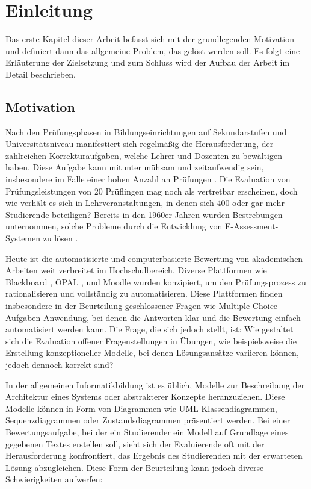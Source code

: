 \chapter{Einleitung}

Das erste Kapitel dieser Arbeit befasst sich mit der grundlegenden Motivation und definiert dann das allgemeine Problem, das gelöst werden soll. Es folgt eine Erläuterung der Zielsetzung und zum Schluss wird der Aufbau der Arbeit im Detail beschrieben.

\section{Motivation}

Nach den Prüfungsphasen in Bildungseinrichtungen auf Sekundarstufen und Universitätsniveau manifestiert sich regelmäßig die Herausforderung, der zahlreichen Korrekturaufgaben, welche Lehrer und Dozenten zu bewältigen haben. Diese Aufgabe kann mitunter mühsam und zeitaufwendig sein, insbesondere im Falle einer hohen Anzahl an Prüfungen \cite{aufwendig}. Die Evaluation von Prüfungsleistungen von 20 Prüflingen mag noch als vertretbar erscheinen, doch wie verhält es sich in Lehrveranstaltungen, in denen sich 400 oder gar mehr Studierende beteiligen? Bereits in den 1960er Jahren wurden Bestrebungen unternommen, solche Probleme durch die Entwicklung von \gls{E-Assessment-Systemen} zu lösen \cite{Hollingsworth}.

Heute ist die automatisierte und computerbasierte Bewertung von akademischen Arbeiten weit verbreitet im Hochschulbereich. Diverse Plattformen wie Blackboard \cite{blackboard}, \ac{OPAL} \cite{opal}, und Moodle \cite{moodle} wurden konzipiert, um den Prüfungsprozess zu rationalisieren und vollständig zu automatisieren. Diese Plattformen finden insbesondere in der Beurteilung geschlossener Fragen wie Multiple-Choice-Aufgaben Anwendung, bei denen die Antworten klar und die Bewertung einfach automatisiert werden kann. Die Frage, die sich jedoch stellt, ist: Wie gestaltet sich die Evaluation offener Fragenstellungen in Übungen, wie beispielsweise die Erstellung konzeptioneller Modelle, bei denen Lösungsansätze variieren können, jedoch dennoch korrekt sind?

In der allgemeinen Informatikbildung ist es üblich, Modelle zur Beschreibung der Architektur eines Systems oder abstrakterer Konzepte heranzuziehen. Diese Modelle können in Form von Diagrammen wie \ac{UML}-Klassendiagrammen, Sequenzdiagrammen oder Zustandsdiagrammen präsentiert werden. Bei einer Bewertungsaufgabe, bei der ein Studierender ein Modell auf Grundlage eines gegebenen Textes erstellen soll, sieht sich der Evaluierende oft mit der Herausforderung konfrontiert, das Ergebnis des Studierenden mit der erwarteten Lösung abzugleichen. Diese Form der Beurteilung kann jedoch diverse Schwierigkeiten aufwerfen: 


